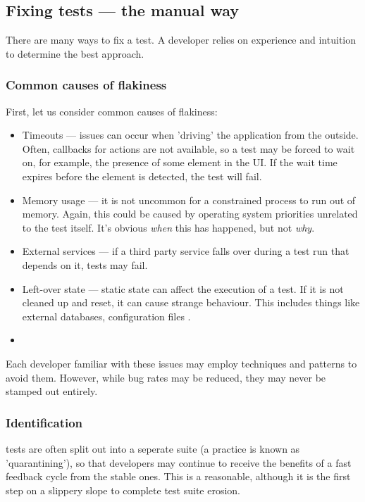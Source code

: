 \subsection{Fixing \flaky tests --- the manual way}

There are many ways to fix a \flaky test. A developer relies on experience and intuition to determine the best approach.

\subsubsection{Common causes of flakiness}

First, let us consider common causes of flakiness:
\begin{itemize}
	\item Timeouts --- issues can occur when 'driving' the application from the outside. Often, callbacks for actions are not available, so a test may be forced to wait on, for example, the presence of some element in the UI. If the wait time expires before the element is detected, the test will fail.
	\item Memory usage --- it is not uncommon for a constrained process to run out of memory. Again, this could be caused by operating system priorities unrelated to the test itself. It's obvious \textit{when} this has happened, but not \textit{why}.
	\item External services --- if a third party service falls over during a test run that depends on it, tests may fail.
	\item Left-over state --- static state can affect the execution of a test. If it is not cleaned up and reset, it can cause strange behaviour. This includes things like external databases, configuration files \etc.
	\item {}
\end{itemize}

Each developer familiar with these issues may employ techniques and patterns to avoid them. However, while bug rates may be reduced, they may never be stamped out entirely.

\subsubsection{Identification}

\flaky tests are often split out into a seperate suite (a practice is known as 'quarantining'), so that developers may continue to receive the benefits of a fast feedback cycle from the stable ones. This is a reasonable, although it is the first step on a slippery slope to complete test suite erosion.

